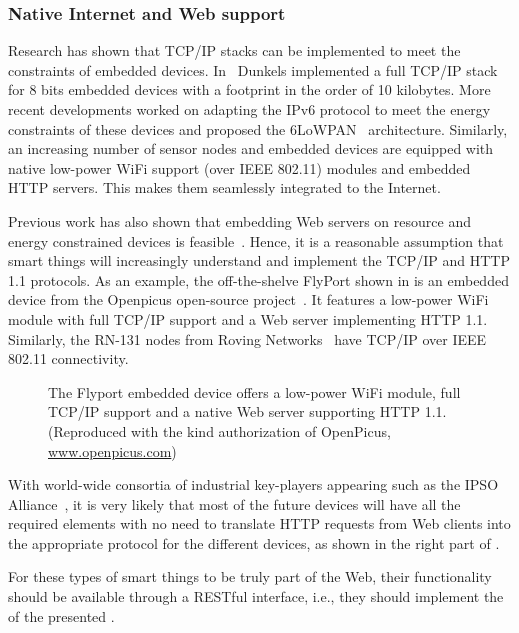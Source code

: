 \subsubsection{Native Internet and Web support}
Research has shown that TCP/IP stacks can be implemented to meet the constraints of embedded devices. In~\cite{Dunkels2003} Dunkels implemented a full TCP/IP stack for 8 bits embedded devices with a footprint in the order of 10 kilobytes. More recent developments worked on adapting the IPv6 protocol to meet the energy constraints of these devices and proposed the 6LoWPAN~\cite{Hui2008} architecture. Similarly, an increasing number of sensor nodes and embedded devices are equipped with native low-power WiFi support (over IEEE 802.11) modules and embedded HTTP servers. This makes them seamlessly integrated to the Internet. 

Previous work has also shown that embedding Web servers on resource and energy constrained devices is feasible~\cite{Duquennoy2009,Lin2004,Guinard2009-INSS}. Hence, it is a reasonable assumption that smart things will increasingly understand and implement the TCP/IP and HTTP 1.1 protocols. As an example, the off-the-shelve FlyPort shown in  is an embedded device from the Openpicus open-source project~. It features a low-power WiFi module with full TCP/IP support and a Web server implementing HTTP 1.1. Similarly, the RN-131 nodes from Roving Networks~ have TCP/IP over IEEE 802.11 connectivity.
\begin{figure}
\caption{The Flyport embedded device offers a low-power WiFi module, full TCP/IP support and a native Web server supporting HTTP 1.1. (Reproduced with the kind authorization of OpenPicus, \url{www.openpicus.com})}
\label{fig:flyport}
\end{figure}
With world-wide consortia of industrial key-players appearing such as the IPSO Alliance~, it is very likely that most of the future devices will have all the required elements with no need to translate HTTP requests from Web clients into the appropriate protocol for the different devices, as shown in the right part of .

For these types of smart things to be truly part of the Web, their functionality should be available through a RESTful interface, i.e., they should implement the \devLayer{} of the presented \WoTA{}.

